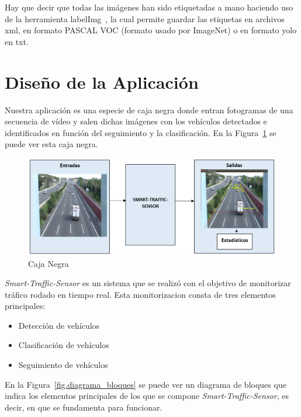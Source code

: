 Hay que decir que todas las imágenes han sido etiquetadas a mano haciendo uso de la herramienta labelImg~\cite{labelimg}, la cual permite guardar las etiquetas en archivos xml, en formato PASCAL VOC (formato usado por ImageNet) o en formato \acrshort{yolo} en txt.

\section{Diseño de la Aplicación}

Nuestra aplicación es una especie de caja negra donde entran fotogramas de una secuencia de vídeo y salen dichas imágenes con los vehículos detectados e identificados en función del seguimiento y la clasificación. En la Figura~\ref{fig.caja_negra} se puede ver esta caja negra.

\begin{figure}[H] 
\begin{center}
	\includegraphics[width=1\textwidth]{figures/Diseno_global/caja_negra.PNG}
   \caption{Caja Negra}
	\label{fig.caja_negra}
\end{center}
\end{figure}

\textit{Smart-Traffic-Sensor} es un sistema que se realizó con el objetivo de monitorizar tráfico rodado en tiempo real. Esta monitorizacion consta de tres elementos principales:

\begin{itemize}
    \item Detección de vehículos
    \item Clasificación de vehículos
    \item Seguimiento de vehículos
\end{itemize}

En la Figura~\ref{fig.diagrama_bloques} se puede ver un diagrama de bloques que indica los elementos principales de los que se compone \textit{Smart-Traffic-Sensor}, es decir, en que se fundamenta para funcionar.

